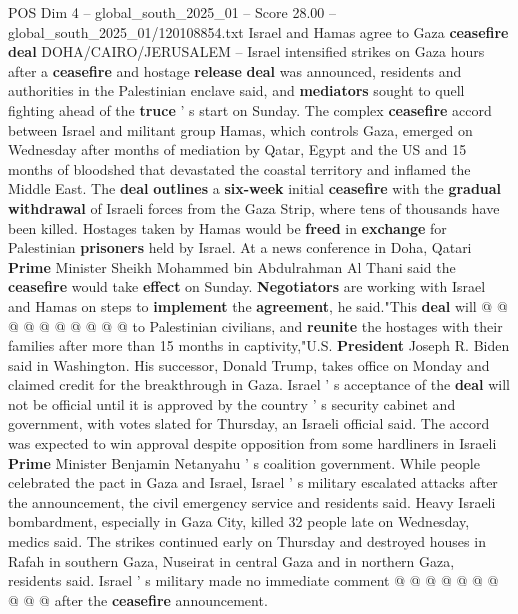 \begin{textsample}{POS Dim 4 – global\_south\_2025\_01 – Score 28.00 – global\_south\_2025\_01/120108854.txt}  \label{ex:f4_pos_005}
Israel and Hamas agree to Gaza \textbf{ceasefire} \textbf{deal} DOHA/CAIRO/JERUSALEM -- Israel intensified strikes on Gaza hours after a \textbf{ceasefire} and hostage \textbf{release} \textbf{deal} was announced, residents and authorities in the Palestinian enclave said, and \textbf{mediators} sought to quell fighting ahead of the \textbf{truce} ' s start on Sunday.
The complex \textbf{ceasefire} accord between Israel and militant group Hamas, which controls Gaza, emerged on Wednesday after months of mediation by Qatar, Egypt and the US and 15 months of bloodshed that devastated the coastal territory and inflamed the Middle East.
The \textbf{deal} \textbf{outlines} a \textbf{six-week} initial \textbf{ceasefire} with the \textbf{gradual} \textbf{withdrawal} of Israeli forces from the Gaza Strip, where tens of thousands have been killed.
Hostages taken by Hamas would be \textbf{freed} in \textbf{exchange} for Palestinian \textbf{prisoners} held by Israel.
At a news conference in Doha, Qatari \textbf{Prime} Minister Sheikh Mohammed bin Abdulrahman Al Thani said the \textbf{ceasefire} would take \textbf{effect} on Sunday. \textbf{Negotiators} are working with Israel and Hamas on steps to \textbf{implement} the \textbf{agreement}, he said."This \textbf{deal} will @ @ @ @ @ @ @ @ @ @ to Palestinian civilians, and \textbf{reunite} the hostages with their families after more than 15 months in captivity,"U.S. \textbf{President} Joseph R.
Biden said in Washington.
His successor, Donald Trump, takes office on Monday and claimed credit for the breakthrough in Gaza.
Israel ' s acceptance of the \textbf{deal} will not be official until it is approved by the country ' s security cabinet and government, with votes slated for Thursday, an Israeli official said.
The accord was expected to win approval despite opposition from some hardliners in Israeli \textbf{Prime} Minister Benjamin Netanyahu ' s coalition government.
While people celebrated the pact in Gaza and Israel, Israel ' s military escalated attacks after the announcement, the civil emergency service and residents said.
Heavy Israeli bombardment, especially in Gaza City, killed 32 people late on Wednesday, medics said.
The strikes continued early on Thursday and destroyed houses in Rafah in southern Gaza, Nuseirat in central Gaza and in northern Gaza, residents said.
Israel ' s military made no immediate comment @ @ @ @ @ @ @ @ @ @ after the \textbf{ceasefire} announcement.

\end{textsample}

